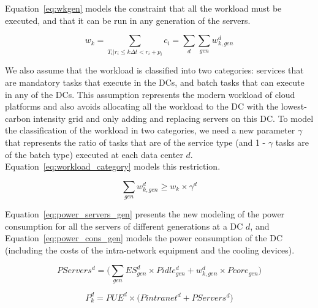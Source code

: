Equation~\eqref{eq:wkgen} models the constraint that all the workload must be executed, and that it can be run in any generation of the servers.

\begin{equation} \label{eq:wkgen}
    w_k = \sum_{T_i|r_i\leq k\Delta t<r_i+p_i} c_i = \sum_d \sum_{gen} w_{k,gen}^d
\end{equation}

We also assume that the workload is classified into two categories: services that are mandatory tasks that execute in the DCs, and batch tasks that can execute in any of the DCs. This assumption represents the modern workload of cloud platforms and also avoids allocating all the workload to the DC with the lowest-carbon intensity grid and only adding and replacing servers on this DC. To model the classification of the workload in two categories, we need a new parameter $\gamma$ that represents the ratio of tasks that are of the service type (and 1 - $\gamma$ tasks are of the batch type) executed at each data center $d$. Equation~\eqref{eq:workload_category} models this restriction.

\begin{equation} \label{eq:workload_category}
 \sum_{gen}  w_{k,gen}^d \geq  w_k \times \gamma^d
\end{equation}


Equation~\eqref{eq:power_servers_gen} presents the new modeling of the power consumption for all the servers of different generations at a DC $d$, and Equation~\eqref{eq:power_cons_gen} models the power consumption of the DC (including the costs of the intra-network equipment and the cooling devices).


\begin{equation} \label{eq:power_servers_gen}
   PServers^d  =  \big(\sum_{gen} ES_{gen}^d \times  Pidle_{gen}^d + w^d_{k,gen}  \times  Pcore_{gen} \big)
\end{equation}


\begin{equation} \label{eq:power_cons_gen}
   P^d_k  = PUE^d \times \big(Pintranet^d + PServers^d\big)
\end{equation}


